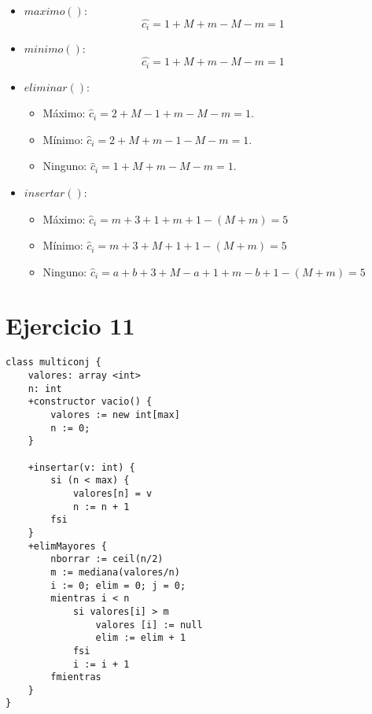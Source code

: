 \documentclass[10pt,a4paper,openright]{book}
\theoremstyle{break}
\begin{document}
\begin{itemize}
    \item $maximo\left( \right)$:
    \[
    \hat{c_i} = 1 + M + m - M - m = 1
    \]
    \item $minimo\left( \right)$:
    \[
    \hat{c_i} = 1 + M + m - M - m = 1
    \]
    \item $eliminar\left( \right)$:
    \begin{itemize}
        \item Máximo: $\hat{c}_i = 2 + M - 1 + m - M - m = 1$.
        \item Mínimo: $\hat{c}_i = 2 + M + m - 1 - M - m = 1$.
        \item Ninguno: $\hat{c}_i = 1 + M + m - M - m = 1$.
    \end{itemize}
    \item $insertar\left( \right)$:
    \begin{itemize}
        \item Máximo: $\hat{c}_i = m + 3 + 1 + m + 1 - \left( M + m \right) = 5$
        \item Mínimo: $\hat{c}_i = m + 3 + M + 1 + 1 - \left( M + m \right) = 5$
        \item Ninguno: $\hat{c}_i = a + b + 3 + M - a + 1 + m - b + 1 - \left( M + m \right) = 5$
    \end{itemize}
\end{itemize}

\section{Ejercicio 11}%
\label{sec:ejercicio_11}
\begin{lstlisting}
class multiconj {
    valores: array <int>
    n: int
    +constructor vacio() {
        valores := new int[max]
        n := 0;
    }

    +insertar(v: int) {
        si (n < max) {
            valores[n] = v
            n := n + 1
        fsi
    }
    +elimMayores {
        nborrar := ceil(n/2)
        m := mediana(valores/n)
        i := 0; elim = 0; j = 0;
        mientras i < n
            si valores[i] > m
                valores [i] := null
                elim := elim + 1
            fsi
            i := i + 1
        fmientras
    }
}
\end{lstlisting}
\end{document}
